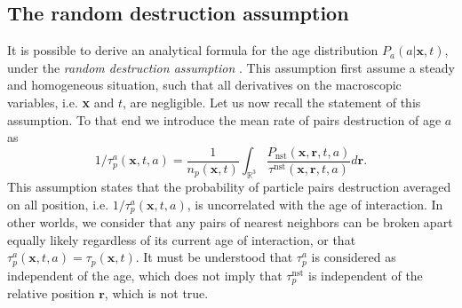 

\subsection{The random destruction assumption}

It is possible to derive an analytical formula for the age distribution $P_a(a|\textbf{x},t)$, under the \textit{random destruction assumption} \citep{zhang2023evolution}.
This assumption first assume a steady and homogeneous situation, such that all derivatives on the macroscopic variables, i.e. \textbf{x} and $t$, are negligible.
Let us now recall the statement of this assumption. 
To that end we introduce the mean rate of pairs destruction of age $a$ as
\begin{equation*}
    1/\tau_p^a(\textbf{x},t,a) 
    = \frac{1}{n_p(\textbf{x},t)}\int_{\mathbb{R}^3} \frac{P_\text{nst}(\textbf{x},\textbf{r},t,a)}{\tau^\text{nst}(\textbf{x},\textbf{r},t,a)} d\textbf{r}.
\end{equation*}
This assumption states that the probability of particle pairs destruction averaged on all position, i.e. $1/\tau_p^a(\textbf{x},t,a)$, is uncorrelated with the age of interaction.
In other worlds, we consider that any pairs of nearest neighbors can be broken apart equally likely regardless of its current age of interaction, or that $\tau^a_p(\textbf{x},t,a) = \tau_p(\textbf{x},t)$.
It must be understood that $\tau^a_p$ is considered as independent of the age, which does not imply that $\tau^\text{nst}_p$ is independent of the relative position $\textbf{r}$, which is not true.

